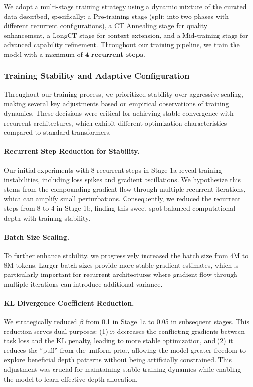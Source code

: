 \documentclass[]{bytedance_seed}
\newcommand{\1}{\mathbf{1}}
\begin{document}
We adopt a multi-stage training strategy using a dynamic mixture of the curated data described, specifically: a Pre-training stage (split into two phases with different recurrent configurations), a CT Annealing stage for quality enhancement, a LongCT stage for context extension, and a Mid-training stage for advanced capability refinement. Throughout our training pipeline, we train the model with a maximum of \textbf{4 recurrent steps}. 

\subsubsection{Training Stability and Adaptive Configuration}

Throughout our training process, we prioritized stability over aggressive scaling, making several key adjustments based on empirical observations of training dynamics. These decisions were critical for achieving stable convergence with recurrent architectures, which exhibit different optimization characteristics compared to standard transformers.

\paragraph{Recurrent Step Reduction for Stability.} Our initial experiments with 8 recurrent steps in Stage 1a reveal training instabilities, including loss spikes and gradient oscillations. We hypothesize this stems from the compounding gradient flow through multiple recurrent iterations, which can amplify small perturbations. Consequently, we reduced the recurrent steps from 8 to 4 in Stage 1b, finding this sweet spot balanced computational depth with training stability.

\paragraph{Batch Size Scaling.} To further enhance stability, we progressively increased the batch size from 4M to 8M tokens. Larger batch sizes provide more stable gradient estimates, which is particularly important for recurrent architectures where gradient flow through multiple iterations can introduce additional variance.

\paragraph{KL Divergence Coefficient Reduction.} We strategically reduced $\beta$ from 0.1 in Stage 1a to 0.05 in subsequent stages. This reduction serves dual purposes: (1) it decreases the conflicting gradients between task loss and the KL penalty, leading to more stable optimization, and (2) it reduces the ``pull'' from the uniform prior, allowing the model greater freedom to explore beneficial depth patterns without being artificially constrained. This adjustment was crucial for maintaining stable training dynamics while enabling the model to learn effective depth allocation.
\end{document}

